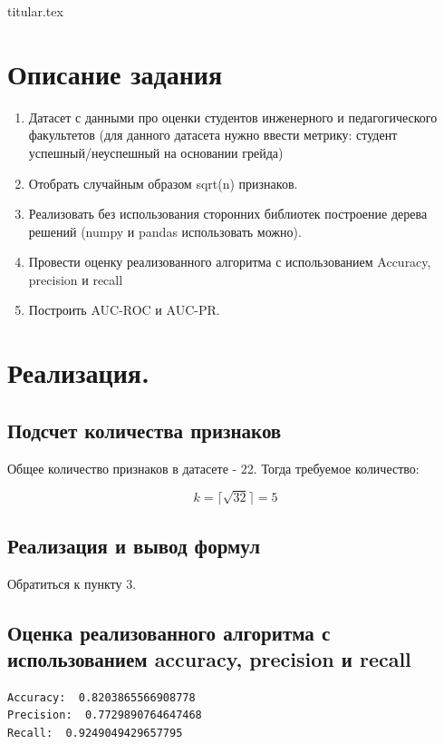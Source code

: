 \documentclass[11pt, a4paper]{article}
\begin{document}
{titular.tex}

\newpage

\section{Описание задания}

\begin{enumerate}
    \item Датасет с данными про оценки студентов инженерного и педагогического факультетов (для данного датасета нужно ввести метрику: студент успешный/неуспешный на основании грейда)
    \item Отобрать случайным образом sqrt(n) признаков.
    \item Реализовать без использования сторонних библиотек построение дерева решений (numpy и pandas использовать можно).
    \item Провести оценку реализованного алгоритма с использованием Accuracy, precision и recall
    \item Построить AUC-ROC и AUC-PR.
\end{enumerate}

\section{Реализация.}

\subsection{Подсчет количества признаков}

Общее количество признаков в датасете - 22. Тогда требуемое количество: 

$$
  k = \lceil \sqrt{32} \rceil = 5
$$

\subsection{Реализация и вывод формул}

Обратиться к пункту 3.

\subsection{Оценка реализованного алгоритма с использованием accuracy, precision и recall}

\begin{Verbatim}
Accuracy:  0.8203865566908778
Precision:  0.7729890764647468
Recall:  0.9249049429657795
\end{Verbatim}
\end{document}
